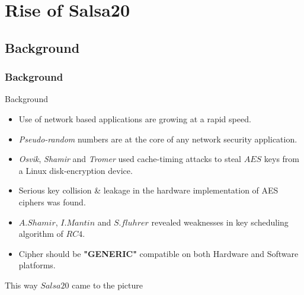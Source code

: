 \section{Rise of Salsa20}
\subsection{Background}
\begin{frame}
\frametitle{Background}

\begin{block}{Background}
    \begin{itemize}
    \item Use of network based applications are growing at a rapid speed.
    \item \textit{Pseudo-random} numbers are at the core of any network security application.
    \item \textit{Osvik}, \textit{Shamir} and \textit{Tromer} used cache-timing attacks to steal $AES$ keys from a Linux disk-encryption device.
    \item Serious key collision \& leakage in the hardware implementation of AES ciphers was found.
    \item $A.Shamir$, $I.Mantin$ and $S.fluhrer$ revealed weaknesses in key scheduling algorithm of $RC4$.
    \item Cipher should be \textbf{"GENERIC"} compatible on both Hardware and Software platforms.
\end{itemize}    
\end{block}

This way $Salsa20$ came to the picture
\end{frame}
